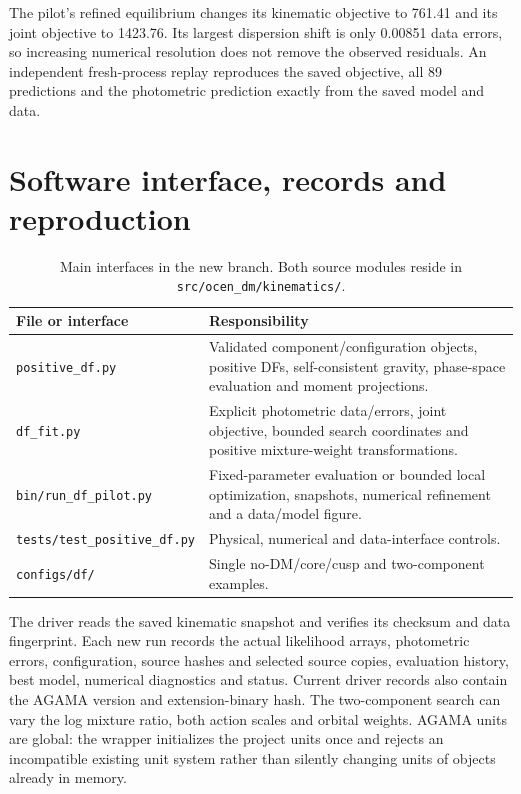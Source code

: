 \documentclass[11pt,a4paper]{article}
\begin{document}
The pilot's refined equilibrium changes its kinematic objective to 761.41
and its joint objective to 1423.76. Its largest dispersion shift is only
0.00851 data errors, so increasing numerical resolution does not remove
the observed residuals. An independent fresh-process replay reproduces
the saved objective, all 89 predictions and the photometric prediction
exactly from the saved model and data.

\section{Software interface, records and reproduction}

\begin{table}[htbp]
\centering\small
\caption{Main interfaces in the new branch. Both source modules reside in
\texttt{src/ocen\_dm/kinematics/}.}
\label{tab:software}
\begin{tabularx}{\linewidth}{lX}
\toprule
File or interface & Responsibility\\
\midrule
\texttt{positive\_df.py} & Validated component/configuration objects, positive DFs,
  self-consistent gravity, phase-space evaluation and moment projections.\\
\texttt{df\_fit.py} & Explicit photometric data/errors, joint objective, bounded
  search coordinates and positive mixture-weight transformations.\\
\texttt{bin/run\_df\_pilot.py} & Fixed-parameter evaluation or bounded local
  optimization, snapshots, numerical refinement and a data/model figure.\\
\texttt{tests/test\_positive\_df.py} & Physical, numerical and data-interface controls.\\
\texttt{configs/df/} & Single no-DM/core/cusp and two-component examples.\\
\bottomrule
\end{tabularx}
\end{table}

The driver reads the saved kinematic snapshot and verifies its checksum and
data fingerprint. Each new run records the actual likelihood arrays,
photometric errors, configuration, source hashes and selected source copies,
evaluation history, best model, numerical diagnostics and status. Current
driver records also contain the AGAMA version and extension-binary hash.
The two-component search can vary the log mixture ratio, both action scales
and orbital weights. AGAMA units are global: the wrapper initializes the
project units once and rejects an incompatible existing unit system rather
than silently changing units of objects already in memory.
\end{document}
